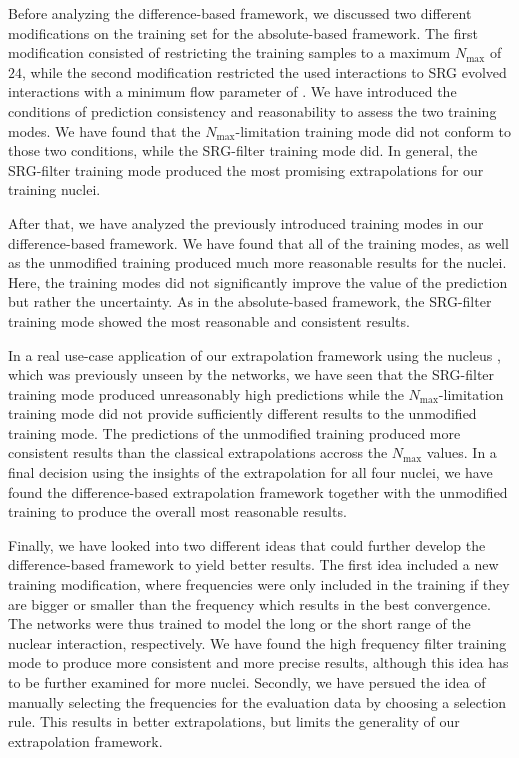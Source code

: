 Before analyzing the difference-based framework, we discussed two different modifications on the training set for the absolute-based framework. The first modification consisted of restricting the training samples to a maximum $N_\mathrm{max}$ of $24$, while the second modification restricted the used interactions to SRG evolved interactions with a minimum flow parameter of . We have introduced the conditions of prediction consistency and reasonability to assess the two training modes. We have found that the $N_\mathrm{max}$-limitation training mode did not conform to those two conditions, while the SRG-filter training mode did. In general, the SRG-filter training mode produced the most promising extrapolations for our training nuclei.

After that, we have analyzed the previously introduced training modes in our difference-based framework. We have found that all of the training modes, as well as the unmodified training produced much more reasonable results for the nuclei. Here, the training modes did not significantly improve the value of the prediction but rather the uncertainty. As in the absolute-based framework, the SRG-filter training mode showed the most reasonable and consistent results.

In a real use-case application of our extrapolation framework using the nucleus , which was previously unseen by the networks, we have seen that the SRG-filter training mode produced unreasonably high predictions while the $N_\mathrm{max}$-limitation training mode did not provide sufficiently different results to the unmodified training mode. The predictions of the unmodified training produced more consistent results than the classical extrapolations accross the $N_\mathrm{max}$ values. In a final decision using the insights of the extrapolation for all four nuclei, we have found the difference-based extrapolation framework together with the unmodified training to produce the overall most reasonable results.

Finally, we have looked into two different ideas that could further develop the difference-based framework to yield better results. The first idea included a new training modification, where frequencies were only included in the training if they are bigger or smaller than the frequency which results in the best convergence. The networks were thus trained to model the long or the short range of the nuclear interaction, respectively. We have found the high frequency filter training mode to produce more consistent and more precise results, although this idea has to be further examined for more nuclei. Secondly, we have persued the idea of manually selecting the frequencies for the evaluation data by choosing a selection rule. This results in better extrapolations, but limits the generality of our extrapolation framework.
